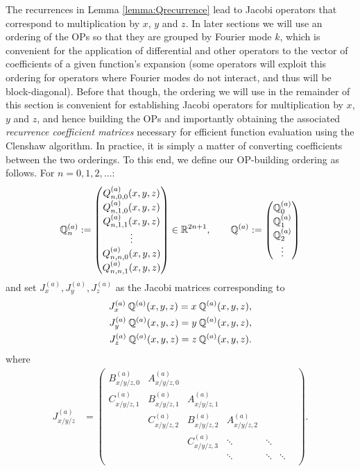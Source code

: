 \documentclass[11pt, oneside]{article}   	%
\begin{document}
The recurrences in Lemma \ref{lemma:Qrecurrence} lead to Jacobi operators that correspond to multiplication by $x$, $y$ and $z$. In later sections we will use an ordering of the OPs so that they are grouped by Fourier mode $k$, which is convenient for the application of differential and other operators to the vector of coefficients of a given function's expansion (some operators will exploit this ordering for operators where Fourier modes do not interact, and thus will be block-diagonal). Before that though, the ordering we will use in the remainder of this section is convenient for establishing Jacobi operators for multiplication by $x$, $y$ and $z$, and hence building the OPs and importantly obtaining the associated \textit{recurrence coefficient matrices} necessary for efficient function evaluation using the Clenshaw algorithm. In practice, it is simply a matter of converting coefficients between the two orderings. To this end, we define our OP-building ordering as follows. For $n=0,1,2,\dots$:
\begin{align*}
	\mathbb{{Q}}^{(a)}_{n} := 
		\begin{pmatrix}
			Q^{(a)}_{n,0,0}(x,y,z) \\
			Q^{(a)}_{n,1,0}(x,y,z) \\
			Q^{(a)}_{n,1,1}(x,y,z) \\
			\vdots \\
			Q^{(a)}_{n,n,0}(x,y,z) \\
			Q^{(a)}_{n,n,1}(x,y,z)
		\end{pmatrix} \in \mathbb{R}^{2n+1}, 
	\quad \quad 
	\mathbb{{Q}}^{(a)} := 
		\begin{pmatrix}
			\mathbb{{Q}}^{(a)}_0 \\
			\mathbb{{Q}}^{(a)}_1 \\
			\mathbb{{Q}}^{(a)}_2 \\
			\vdots \\
		\end{pmatrix}
\end{align*}
and set $ J_x^{(a)},  J_y^{(a)},  J_z^{(a)}$ as the Jacobi matrices corresponding to
\begin{align}
	J_x^{(a)} \: \mathbb{{Q}}^{(a)}(x,y,z) = x \: \mathbb{{Q}}^{(a)}(x,y,z), \nonumber \\
	J_y^{(a)} \: \mathbb{{Q}}^{(a)}(x,y,z) = y \: \mathbb{{Q}}^{(a)}(x,y,z), \label{eqn:jacobimatricesdefinitionalt} \\
	J_z^{(a)} \: \mathbb{{Q}}^{(a)}(x,y,z) = z \: \mathbb{{Q}}^{(a)}(x,y,z). \nonumber
\end{align}
where
\begin{align*}
	J_{x/y/z}^{(a)} &= 
		\begin{pmatrix}
			B^{(a)}_{x/y/z, 0} & A^{(a)}_{x/y/z, 0} & & & & \\
			C^{(a)}_{x/y/z, 1} & B^{(a)}_{x/y/z, 1} & A^{(a)}_{x/y/z, 1} & & & \\
			& C^{(a)}_{x/y/z, 2} & B^{(a)}_{x/y/z, 2} & A^{(a)}_{x/y/z, 2} & & & \\
			& & C^{(a)}_{x/y/z, 3} & \ddots & \ddots & \\
			& & & \ddots & \ddots & \ddots \\
		\end{pmatrix}.
\end{align*}
\end{document}
